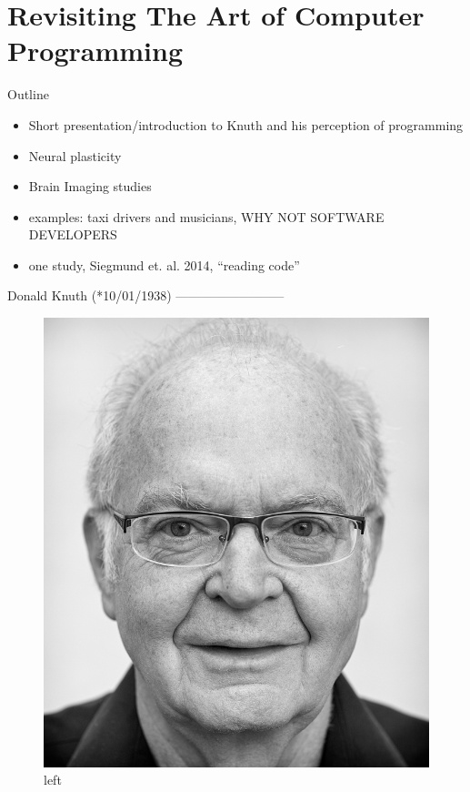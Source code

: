 \section{Revisiting The Art of Computer
Programming}\label{revisiting-the-art-of-computer-programming}

\begin{frame}{Outline}

\begin{itemize}
\item
  Short presentation/introduction to Knuth and his perception of
  programming
\item
  Neural plasticity
\item
  Brain Imaging studies
\item
  examples: taxi drivers and musicians, WHY NOT SOFTWARE DEVELOPERS
\item
  one study, Siegmund et. al. 2014, ``reading code''
\end{itemize}

Donald Knuth (*10/01/1938) --------------------------

\begin{figure}
\centering
\includegraphics{./media/Knuth-A-small.jpg}
\caption{left}
\end{figure}


\end{frame}
